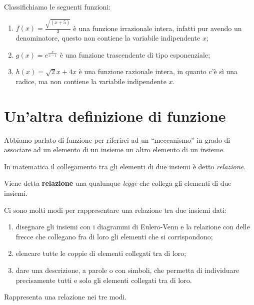 \begin{esempio}
Classifichiamo le seguenti funzioni: 
\begin{enumerate}
\item \(f(x) = \frac{\sqrt{(x+5)}}{3}\) è una funzione 
irrazionale intera, infatti pur avendo un denominatore, questo non contiene 
la variabile indipendente \(x\);
\item \(g(x) = e^{\frac{x}{x-1}}\) è una funzione 
trascendente di tipo esponenziale;
\item \(h(x) = \sqrt{2}x+4x\) è una funzione razionale 
intera, in quanto c'è sì una radice, ma non contiene la variabile 
indipendente \(x\).
\end{enumerate}
\end{esempio}

\newpage %

\section{Un'altra definizione di funzione}

Abbiamo parlato di funzione per riferirci ad un ``meccanismo'' in grado di 
associare ad un elemento di un insieme un altro elemento di un insieme.

In matematica il collegamento tra gli elementi di due insiemi è detto 
\emph{relazione}.

\begin{definizione}
Viene detta \textbf{relazione} una qualunque \emph{legge} che collega gli 
elementi di due insiemi.
\end{definizione}

Ci sono molti modi per rappresentare una relazione tra due insiemi dati:
\begin{enumerate}
\item disegnare gli insiemi con i diagrammi di Eulero-Venn e la relazione 
con delle frecce che collegano fra di loro gli elementi che si corrispondono; 
\item elencare tutte le coppie di elementi collegati tra di loro; 
\item dare una descrizione, a parole o con simboli, che permetta di individuare 
precisamente tutti e solo gli elementi collegati tra di loro. 
\end{enumerate}

\begin{esempio}
Rappresenta una relazione nei tre modi.\\

\end{esempio}

